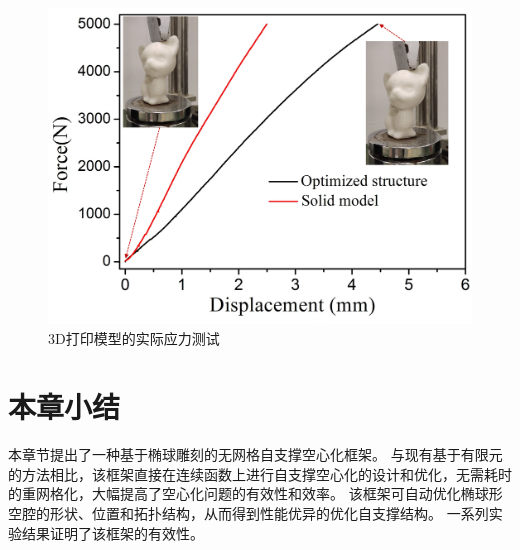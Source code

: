 \begin{figure}[htbp]
  \begin {center}
  \includegraphics[width=0.6 \textwidth]{./figures/self-support/fig15.png}
  \caption{3D打印模型的实际应力测试 }
  \label{fig:16}
  \end {center}
\end{figure}

\section{本章小结}
本章节提出了一种基于椭球雕刻的无网格自支撑空心化框架。
与现有基于有限元的方法相比，该框架直接在连续函数上进行自支撑空心化的设计和优化，无需耗时的重网格化，大幅提高了空心化问题的有效性和效率。
该框架可自动优化椭球形空腔的形状、位置和拓扑结构，从而得到性能优异的优化自支撑结构。
一系列实验结果证明了该框架的有效性。
